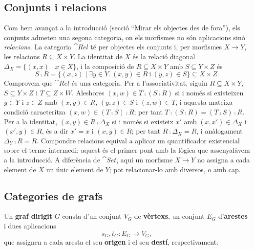 \subsection{Conjunts i relacions}

Com hem avançat a la introducció (secció \enquote{Mirar els objectes des de fora}), els conjunts admeten una segona categoria, on els morfismes no són aplicacions sinó \emph{relacions}. La categoria $\cat{Rel}$ té per objectes els conjunts i, per morfismes $X\to Y$, les relacions $R\subseteq X\times Y$. La identitat de $X$ és la relació diagonal $\Delta_X=\{(x,x)\mid x\in X\}$, i la composició de $R\subseteq X\times Y$ amb $S\subseteq Y\times Z$ és
\[
S\comp R=\{(x,z)\mid \exists y\in Y.\ (x,y)\in R \ \text{i}\ (y,z)\in S\}\subseteq X\times Z.
\]
Comprovem que $\cat{Rel}$ és una categoria. Per a l'associativitat, siguin $R\subseteq X\times Y$, $S\subseteq Y\times Z$ i $T\subseteq Z\times W$. Aleshores $(x,w)\in T\comp(S\comp R)$ si i només si existeixen $y\in Y$ i $z\in Z$ amb $(x,y)\in R$, $(y,z)\in S$ i $(z,w)\in T$, i aquesta mateixa condició caracteritza $(x,w)\in(T\comp S)\comp R$; per tant $T\comp(S\comp R)=(T\comp S)\comp R$. Per a la identitat, $(x,y)\in R\comp\Delta_X$ si i només si existeix $x'$ amb $(x,x')\in\Delta_X$ i $(x',y)\in R$, és a dir $x'=x$ i $(x,y)\in R$; per tant $R\comp\Delta_X=R$, i anàlogament $\Delta_Y\comp R=R$. Compondre relacions equival a aplicar un quantificador existencial sobre el terme intermedi: aquest és el primer pont amb la lògica que assenyalàvem a la introducció. A diferència de $\cat{Set}$, aquí un morfisme $X\to Y$ no assigna a cada element de $X$ un únic element de $Y$; pot relacionar-lo amb diversos, o amb cap.

\subsection{Categories de grafs}\label{subsec:grafs}

\begin{definicio}
Un \textbf{graf dirigit} $G$ consta d'un conjunt $V_G$ de \textbf{vèrtexs}, un conjunt $E_G$ d'\textbf{arestes} i dues aplicacions
\[
s_G,t_G\colon E_G\longrightarrow V_G,
\]
que assignen a cada aresta el seu \textbf{origen} i el seu \textbf{destí}, respectivament.
\end{definicio}

